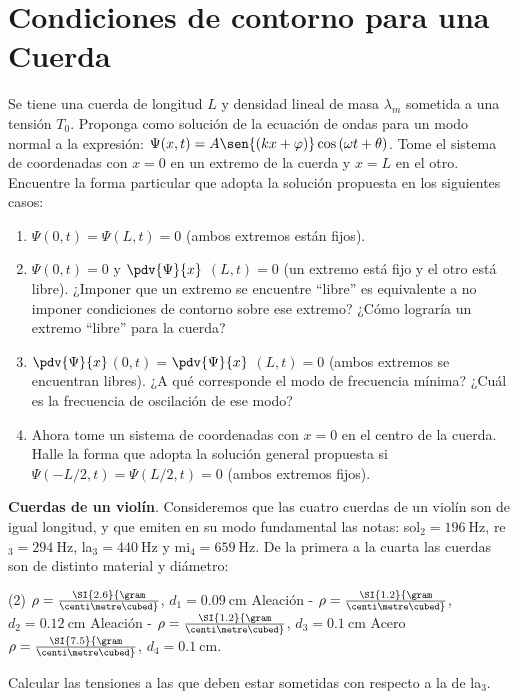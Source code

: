 \section*{Condiciones de contorno para una Cuerda}

\item Se tiene una cuerda de longitud $L$ y densidad lineal de masa $\lambda_m$ sometida a una tensión $T_{0}$.
Proponga como solución de la ecuación de ondas para un modo normal a la expresión: $\Psi(x,t)= A \sen{ \left(k x+ \varphi \right ) } \cos{ \left( \omega t + \theta \right) }$.
Tome el sistema de coordenadas con $x=0$ en un extremo de la cuerda y $x=L$ en el otro.
Encuentre la forma particular que adopta la solución propuesta en los siguientes casos: 
\begin{enumerate}
	\item $\Psi(0,t) = \Psi(L,t) = 0$ (ambos extremos están fijos). 
	\item $\Psi(0,t) = 0$ y $\pdv{\Psi}{x}$ $(L,t)= 0$ (un extremo está fijo y el otro está libre).
	¿Imponer que un extremo se encuentre ``libre'' es equivalente a no imponer condiciones de contorno sobre ese extremo?
	¿Cómo lograría un extremo ``libre'' para la cuerda? 
	\item $\pdv{\Psi}{x}$$(0,t)=$$ \pdv{\Psi}{x}$ $(L,t)= 0$ (ambos extremos se encuentran libres).
	¿A qué corresponde el modo de frecuencia mínima?
	¿Cuál es la frecuencia de oscilación de ese modo? 
	\item Ahora tome un sistema de coordenadas con $x=0$ en el centro de la cuerda.
	Halle la forma que adopta la solución general propuesta si $\Psi(-L/2,t)= \Psi(L/2,t)= 0$ (ambos extremos fijos).
\end{enumerate}



\item \textbf{Cuerdas de un violín}.
Consideremos que las cuatro cuerdas de un violín son de igual longitud, y que emiten en su modo fundamental las notas: sol$_\text{2}= \SI{196}{\hertz}$, re$_\text{3}= \SI{294}{\hertz}$, la$_\text{3}= \SI{440}{\hertz}$ y mi$_\text{4}= \SI{659}{\hertz}$.
De la primera a la cuarta las cuerdas son de distinto material y diámetro:
\begin{tasks}[style=enumerate](2)
	\task {} \(\rho= \SI{2.6}{\gram\over\centi\metre\cubed}\), \(d_1= \SI{0,09}{\centi\metre}\)
	\task Aleación - $\rho = \SI{1.2}{\gram\over\centi\metre\cubed}$, $d_2 = \SI{0.12}{\centi\metre}$
	\task Aleación - $\rho = \SI{1.2}{\gram\over\centi\metre\cubed}$, $d_3 = \SI{0.1}{\centi\metre}$
	\task Acero $\rho = \SI{7.5}{\gram\over\centi\metre\cubed}$, $d_4 = \SI{0.1}{\centi\metre}$.
\end{tasks}
Calcular las tensiones a las que deben estar sometidas con respecto a la de la$_\text{3}$.



